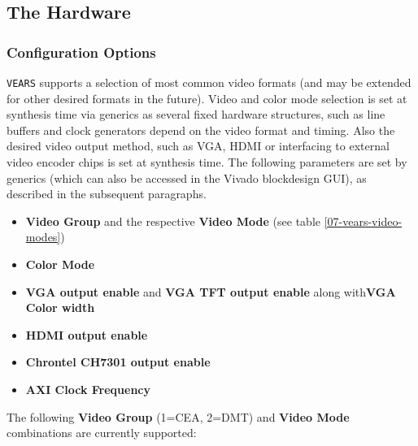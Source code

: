 \subsection{The Hardware}


\subsubsection{Configuration Options}


\texttt{VEARS} supports a selection of most common video formats (and may be extended for other desired formats in the future). 
Video and color mode selection is set at synthesis time via generics as several fixed hardware structures, such as line buffers and clock generators depend on the video format and timing. Also the desired video output method, such as VGA, HDMI or interfacing to external video encoder chips is set at synthesis time. 
The following parameters are set by generics (which can also be accessed in the Vivado blockdesign GUI), as described in the subsequent paragraphs.

\begin{itemize}
	\item \textbf{Video Group} and the respective \textbf{Video Mode} (see table \ref{07-vears-video-modes})
	\item \textbf{Color Mode}
	\item \textbf{VGA output enable} and \textbf{VGA TFT output enable} along with\textbf{VGA Color width}
	\item \textbf{HDMI output enable}
	\item \textbf{Chrontel CH7301 output enable}
  \item \textbf{AXI Clock Frequency}
  
\end{itemize}



The following \textbf{Video Group} (1=CEA, 2=DMT) and \textbf{Video Mode} combinations are currently supported:

